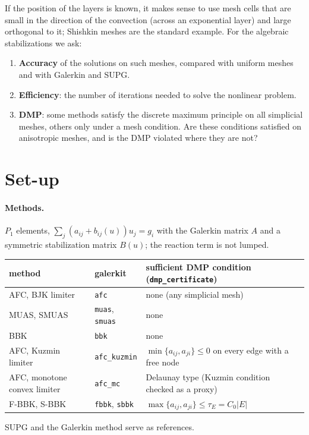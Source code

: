 \documentclass[11pt]{article}
\begin{document}
If the position of the layers is known, it makes sense to use mesh cells that are small in the direction of the
convection (across an exponential layer) and large orthogonal to it; Shishkin meshes are the standard example. For the
algebraic stabilizations we ask:
\begin{enumerate}[leftmargin=*]
\item \textbf{Accuracy} of the solutions on such meshes, compared with uniform meshes and with Galerkin and SUPG.
\item \textbf{Efficiency}: the number of iterations needed to solve the nonlinear problem.
\item \textbf{DMP}: some methods satisfy the discrete maximum principle on all simplicial meshes, others only under a
  mesh condition. Are these conditions satisfied on anisotropic meshes, and is the DMP violated where they are not?
\end{enumerate}

\section{Set-up}

\paragraph{Methods.} $P_1$ elements, $\sum_j(a_{ij}+b_{ij}(u))u_j=g_i$ with the Galerkin matrix $A$ and a symmetric
stabilization matrix $B(u)$; the reaction term is not lumped.
\begin{center}\small
\begin{tabular}{lll}
\toprule
method & galerkit & sufficient DMP condition (\texttt{dmp\_certificate})\\
\midrule
AFC, BJK limiter & \texttt{afc} & none (any simplicial mesh)\\
MUAS, SMUAS & \texttt{muas}, \texttt{smuas} & none\\
BBK & \texttt{bbk} & none\\
AFC, Kuzmin limiter & \texttt{afc\_kuzmin} & $\min\{a_{ij},a_{ji}\}\le0$ on every edge with a free node\\
AFC, monotone convex limiter & \texttt{afc\_mc} & Delaunay type (Kuzmin condition checked as a proxy)\\
F-BBK, S-BBK & \texttt{fbbk}, \texttt{sbbk} & $\max\{a_{ij},a_{ji}\}\le\tau_E=C_0|E|$\\
\bottomrule
\end{tabular}
\end{center}
SUPG and the Galerkin method serve as references.
\end{document}
